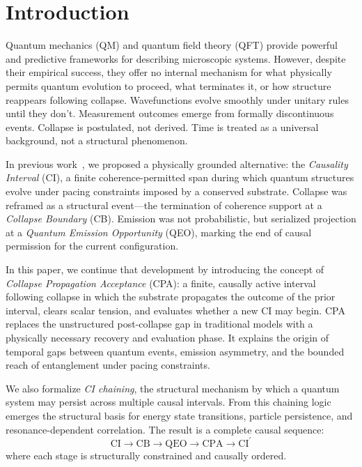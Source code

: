 \documentclass[preprints,article,submit,pdftex,moreauthors]{Definitions/mdpi}
\begin{document}

\section{Introduction}
Quantum mechanics (QM) and quantum field theory (QFT) provide powerful and predictive frameworks for describing microscopic systems. However, despite their empirical success, they offer no internal mechanism for what physically permits quantum evolution to proceed, what terminates it, or how structure reappears following collapse. Wavefunctions evolve smoothly under unitary rules until they don’t. Measurement outcomes emerge from formally discontinuous events. Collapse is postulated, not derived. Time is treated as a universal background, not a structural phenomenon.

In previous work~\cite{bush-qmqft}, we proposed a physically grounded alternative: the \emph{Causality Interval} (CI), a finite coherence-permitted span during which quantum structures evolve under pacing constraints imposed by a conserved substrate. Collapse was reframed as a structural event---the termination of coherence support at a \emph{Collapse Boundary} (CB). Emission was not probabilistic, but serialized projection at a \emph{Quantum Emission Opportunity} (QEO), marking the end of causal permission for the current configuration.

In this paper, we continue that development by introducing the concept of \emph{Collapse Propagation Acceptance} (CPA): a finite, causally active interval following collapse in which the substrate propagates the outcome of the prior interval, clears scalar tension, and evaluates whether a new CI may begin. CPA replaces the unstructured post-collapse gap in traditional models with a physically necessary recovery and evaluation phase. It explains the origin of temporal gaps between quantum events, emission asymmetry, and the bounded reach of entanglement under pacing constraints.

We also formalize \emph{CI chaining}, the structural mechanism by which a quantum system may persist across multiple causal intervals. From this chaining logic emerges the structural basis for energy state transitions, particle persistence, and resonance-dependent correlation. The result is a complete causal sequence:
\[
\text{CI} \rightarrow \text{CB} \rightarrow \text{QEO} \rightarrow \text{CPA} \rightarrow \text{CI}^{\prime}
\]
where each stage is structurally constrained and causally ordered.
\end{document}
